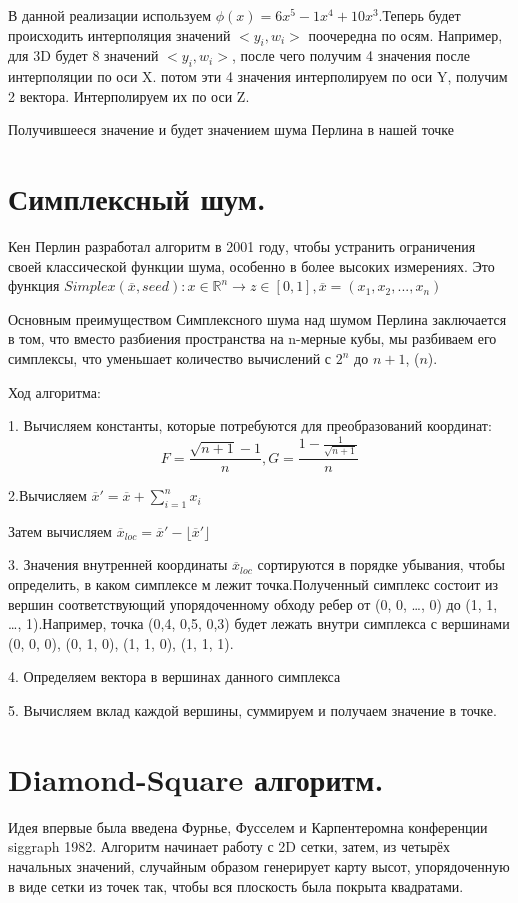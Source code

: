 В данной реализации используем $\phi(x)=6x^5-1x^4+10x^3$.Теперь будет происходить интерполяция значений $<y_i,w_i>$ поочередна по осям. Например, для 3D будет 8 значений $<y_i,w_i>$, после чего получим 4 значения после интерполяции по оси X. потом эти 4 значения интерполируем по оси Y, получим 2 вектора. Интерполируем их по оси Z.

Получившееся значение и будет значением шума Перлина в нашей точке
\section{Симплексный шум.}
Кен Перлин разработал алгоритм в 2001 году, чтобы устранить ограничения своей классической функции шума, особенно в более высоких измерениях. Это функция $Simplex(\overline{x},seed): x \in \mathbb{R}^n \rightarrow z\in [0,1], \overline{x}=(x_1,x_2,...,x_n)$

Основным преимуществом Симплексного шума над шумом Перлина заключается в том, что вместо разбиения пространства на n-мерные кубы, мы разбиваем его симплексы, что уменьшает количество вычислений с $2^n$ до $n+1$, ($n$).

Ход алгоритма:

1. Вычисляем константы, которые потребуются для преобразований координат: $$F=\frac{\sqrt{n+1}-1}{n}, G=\frac{1-\frac{1}{\sqrt{n+1}}}{n}$$

2.Вычисляем $\overline{x}'=\overline{x}+\sum_{i=1}^nx_i$

Затем вычисляем $ \overline{x}_{loc}= \overline{x}'- \lfloor \overline{x}' \rfloor$

3. Значения внутренней координаты $ \overline{x}_{loc}$ сортируются в порядке убывания, чтобы определить, в каком симплексе м лежит точка.Полученный симплекс состоит из вершин соответствующий упорядоченному обходу ребер от (0, 0, …, 0) до (1, 1, …, 1).Например, точка (0,4, 0,5, 0,3) будет лежать внутри симплекса с вершинами (0, 0, 0), (0, 1, 0), (1, 1, 0), (1, 1, 1).

4. Определяем вектора в вершинах данного симплекса

5. Вычисляем вклад каждой вершины, суммируем и получаем значение в точке. 

\section{Diamond-Square алгоритм.}

Идея впервые была введена Фурнье, Фусселем и Карпентеромна конференции siggraph 1982. Алгоритм начинает работу с 2D сетки, затем, из четырёх начальных значений, случайным образом генерирует карту высот, упорядоченную в виде сетки из точек так, чтобы вся плоскость была покрыта квадратами.

